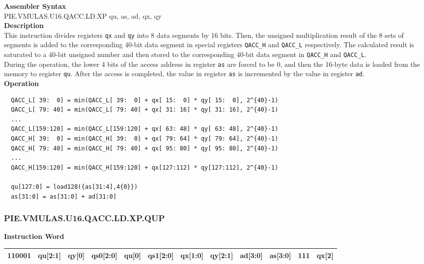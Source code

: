 \textbf{Assembler Syntax} \\
PIE.VMULAS.U16.QACC.LD.XP qu, as, ad, qx, qy \\
\textbf{Description} \\
This instruction divides registers \lstinline{qx} and \lstinline{qy} into 8 data segments by 16 bits. Then, the unsigned multiplication result of the 8 sets of segments is added to the corresponding 40-bit data segment in special registers \lstinline{QACC_H} and \lstinline{QACC_L} respectively. The calculated result is saturated to a 40-bit unsigned number and then stored to the corresponding 40-bit data segment in \lstinline{QACC_H} and \lstinline{QACC_L}.\\
During the operation, the lower 4 bits of the access address in register \lstinline{as} are forced to be 0, and then the 16-byte data is loaded from the memory to register \lstinline{qu}. After the access is completed, the value in register \lstinline{as} is incremented by the value in register \lstinline{ad}.\\
\textbf{Operation}
\begin{lstlisting}
  QACC_L[ 39:  0] = min(QACC_L[ 39:  0] + qx[ 15:  0] * qy[ 15:  0], 2^{40}-1)
  QACC_L[ 79: 40] = min(QACC_L[ 79: 40] + qx[ 31: 16] * qy[ 31: 16], 2^{40}-1)
  ...
  QACC_L[159:120] = min(QACC_L[159:120] + qx[ 63: 48] * qy[ 63: 48], 2^{40}-1)
  QACC_H[ 39:  0] = min(QACC_H[ 39:  0] + qx[ 79: 64] * qy[ 79: 64], 2^{40}-1)
  QACC_H[ 79: 40] = min(QACC_H[ 79: 40] + qx[ 95: 80] * qy[ 95: 80], 2^{40}-1)
  ...
  QACC_H[159:120] = min(QACC_H[159:120] + qx[127:112] * qy[127:112], 2^{40}-1)

  qu[127:0] = load128({as[31:4],4{0}})
  as[31:0] = as[31:0] + ad[31:0]
\end{lstlisting}

\newpage
\subsubsection{PIE.VMULAS.U16.QACC.LD.XP.QUP}\label{instruction:PIEVMULASU16QACCLDXPQUP}
\setlength\tabcolsep{6pt}
\textbf{Instruction Word} \\
\begin{tabular}{|c|c|c|c|c|c|c|c|c|c|c|c|}
	\hline
	110001 & qu[2:1] & qy[0] & qs0[2:0] & qu[0] & qs1[2:0] & qx[1:0] & qy[2:1] & ad[3:0] & as[3:0] & 111 & qx[2] \\
	\hline
\end{tabular}

